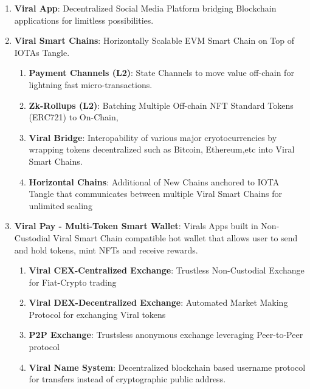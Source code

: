 \documentclass[10pt]{article}
\begin{document}
\begin{enumerate}

\item \textbf{Viral App}: Decentralized Social Media Platform bridging Blockchain applications for limitless possibilities.

\item \textbf{Viral Smart Chains}: Horizontally Scalable EVM Smart Chain on Top of IOTA\textsc{}s Tangle.

\begin{enumerate}

	\item \textbf{Payment Channels (L2)}: State Channels to move value off-chain for lightning fast micro-transactions.

	\item \textbf{Zk-Rollups (L2)}: Batching Multiple Off-chain NFT Standard Tokens (ERC721) to On-Chain,
	\item \textbf{Viral Bridge}: Interopability of various major cryotocurrencies by wrapping tokens decentralized such as Bitcoin, Ethereum,etc into Viral Smart Chains.
	\item \textbf{Horizontal Chains}: Additional of New Chains anchored to IOTA Tangle that communicates between multiple Viral Smart Chains for unlimited scaling

\end{enumerate}

\item \textbf{Viral Pay - Multi-Token Smart Wallet}: Viral\textsc{}s App\textsc{}s built in Non-Custodial Viral Smart Chain compatible hot wallet that allows user to send and hold tokens, mint NFTs and receive rewards.

\begin{enumerate}

\item \textbf{Viral CEX-Centralized Exchange}: Trustless Non-Custodial Exchange for Fiat-Crypto trading
\item \textbf{Viral DEX-Decentralized Exchange}: Automated Market Making Protocol for exchanging Viral tokens
\item \textbf{P2P Exchange}: Trustsless anonymous exchange leveraging Peer-to-Peer protocol
\item \textbf{Viral Name System}: Decentralized blockchain based username protocol for transfers instead of cryptographic public address.

\end{enumerate}


\end{enumerate}
\end{document}

